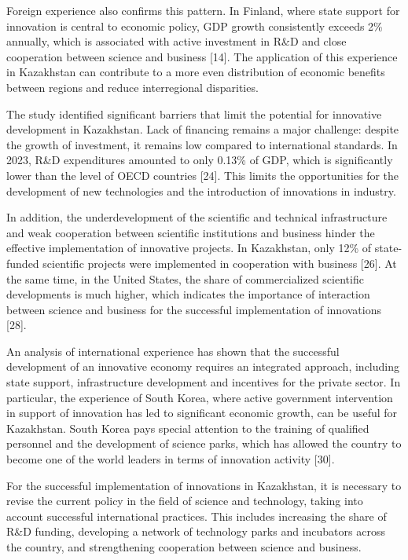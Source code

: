\begin{multicols}{2}
Foreign experience also confirms this pattern. In Finland, where state
support for innovation is central to economic policy, GDP growth
consistently exceeds 2\% annually, which is associated with active
investment in R\&D and close cooperation between science and business
{[}14{]}. The application of this experience in Kazakhstan can
contribute to a more even distribution of economic benefits between
regions and reduce interregional disparities.

The study identified significant barriers that limit the potential for
innovative development in Kazakhstan. Lack of financing remains a major
challenge: despite the growth of investment, it remains low compared to
international standards. In 2023, R\&D expenditures amounted to only
0.13\% of GDP, which is significantly lower than the level of OECD
countries {[}24{]}. This limits the opportunities for the development of
new technologies and the introduction of innovations in industry.

In addition, the underdevelopment of the scientific and technical
infrastructure and weak cooperation between scientific institutions and
business hinder the effective implementation of innovative projects. In
Kazakhstan, only 12\% of state-funded scientific projects were
implemented in cooperation with business {[}26{]}. At the same time, in
the United States, the share of commercialized scientific developments
is much higher, which indicates the importance of interaction between
science and business for the successful implementation of innovations
{[}28{]}.

An analysis of international experience has shown that the successful
development of an innovative economy requires an integrated approach,
including state support, infrastructure development and incentives for
the private sector. In particular, the experience of South Korea, where
active government intervention in support of innovation has led to
significant economic growth, can be useful for Kazakhstan. South Korea
pays special attention to the training of qualified personnel and the
development of science parks, which has allowed the country to become
one of the world leaders in terms of innovation activity {[}30{]}.

For the successful implementation of innovations in Kazakhstan, it is
necessary to revise the current policy in the field of science and
technology, taking into account successful international practices. This
includes increasing the share of R\&D funding, developing a network of
technology parks and incubators across the country, and strengthening
cooperation between science and business.


\end{multicols}
